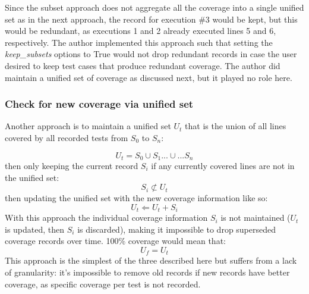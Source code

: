 Since the subset approach does not aggregate all the coverage into a 
single unified set as in the next approach, the record for execution \#3 would
be kept, but this would be redundant, as executions 1 and 2 already executed
lines 5 and 6, respectively.
The author implemented this approach such that setting the \textit{keep\_subsets}
options to True would not drop redundant records in case the user desired to keep
test cases that produce redundant coverage. The author did maintain a unified
set of coverage as discussed next, but it played no role here.

\subsubsection{Check for new coverage via unified set}\label{sec:tuning-2}
Another approach is to maintain a unified set $U_t$ that is the union of all lines 
covered by all recorded tests from $S_0$ to $S_n$: 

\begin{equation*}
  U_t = S_0 \cup S_1 ...\cup... S_n
\end{equation*}
then only keeping the current record $S_i$ if any currently 
covered lines are not in the unified set:
\begin{equation*}
  S_i \not \subset U_t
\end{equation*}
then updating the unified set with the new coverage information like so:
\begin{equation*}
  U_t \Leftarrow U_t + S_i
\end{equation*} 
With this approach the individual coverage information $S_i$ is not maintained 
($U_t$ is updated, then $S_i$ is discarded), making it impossible to drop superseded 
coverage records over time.  100\% coverage would mean that:
\begin{equation*}
  U_f = U_t
\end{equation*} 
This approach is the simplest of the three described here but suffers from a 
lack of granularity: it's impossible to remove old records if new records have 
better coverage, as specific coverage per test is not recorded.

